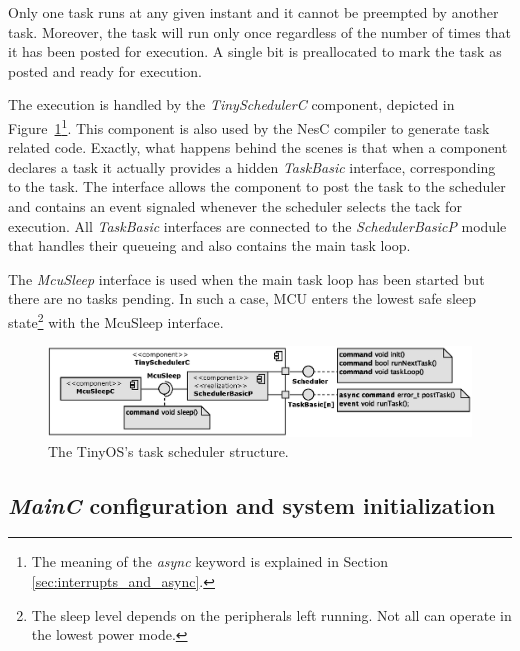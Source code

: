 Only one task runs at any given instant and it cannot be preempted by another task. Moreover, the task will run only once regardless of the number of times that it has been posted for execution. A single bit is preallocated to mark the task as posted and ready for execution.

The execution is handled by the \emph{TinySchedulerC} component, depicted in Figure~\ref{fig:tinyschedulerc}\footnote{The meaning of the \emph{async} keyword is explained in Section \ref{sec:interrupts_and_async}.}. This component is also used by the NesC compiler to generate task related code. Exactly, what happens behind the scenes is that when a component declares a task it actually provides a hidden \emph{TaskBasic} interface, corresponding to the task. The interface allows the component to post the task to the scheduler and contains an event signaled whenever the scheduler selects the tack for execution.  All \emph{TaskBasic} interfaces are connected to the \emph{SchedulerBasicP} module that handles their queueing and also contains the main task loop.

The \emph{McuSleep} interface is used when the main task loop has been started but there are no tasks pending. In such a case, MCU enters the lowest safe sleep state\footnote{The sleep level depends on the peripherals left running. Not all can operate in the lowest power mode.} with the McuSleep interface.

\begin{figure}[h]
  \centering
  \includegraphics[width=1.02\textwidth]{diagrams/tinyschedulerc.eps}
  \caption{The TinyOS's task scheduler structure.}
  \label{fig:tinyschedulerc}
\end{figure}

\subsection{\emph{MainC} configuration and system initialization}

